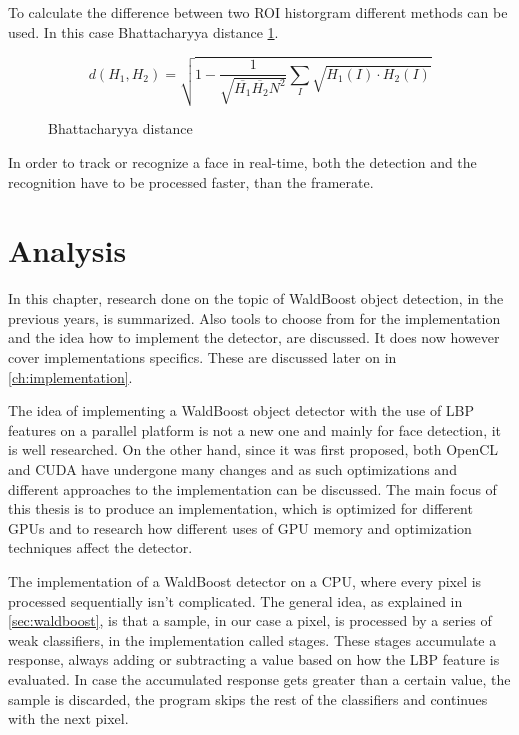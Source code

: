 To calculate the difference between two ROI historgram different methods can be used. In this case Bhattacharyya distance \ref{eq:bhatta}.

\begin{figure}
\begin{equation}
d(H_{1},H_{2})=\sqrt{1-\frac{1}{\sqrt{\overline{H_{1}}\overline{H_{2}}N^2}}\sum\limits_{I}\sqrt{H_{1}(I) \cdot H_{2}(I)}}
\end{equation}
\caption{Bhattacharyya distance}
\label{eq:bhatta}
\end{figure}

In order to track or recognize a face in real-time, both the detection and the recognition have to be processed faster, than the framerate.

\chapter{Analysis}

In this chapter, research done on the topic of WaldBoost object detection, in the previous years, is summarized. Also tools to choose from for the implementation and the idea how to implement the detector, are discussed. It does now however cover implementations specifics. These are discussed later on in \ref{ch:implementation}.

The idea of implementing a WaldBoost object detector with the use of LBP features on a parallel platform is not a new one and mainly for face detection, it is well researched. On the other hand, since it was first proposed, both OpenCL and CUDA have undergone many changes and as such optimizations and different approaches to the implementation can be discussed. The main focus of this thesis is to produce an implementation, which is optimized for different GPUs and to research how different uses of GPU memory and optimization techniques affect the detector.

The implementation of a WaldBoost detector on a CPU, where every pixel is processed sequentially isn't complicated. The general idea, as explained in \ref{sec:waldboost}, is that a sample, in our case a pixel, is processed by a series of weak classifiers, in the implementation called stages. These stages accumulate a response, always adding or subtracting a value based on how the LBP feature is evaluated. In case the accumulated response gets greater than a certain value, the sample is discarded, the program skips the rest of the classifiers and continues with the next pixel.

